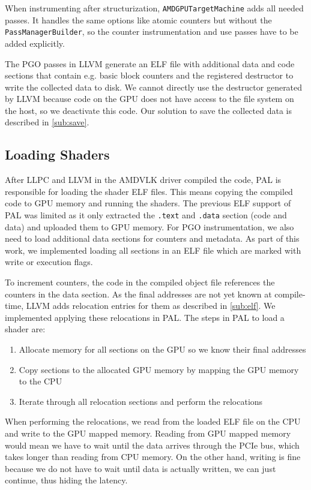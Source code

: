 When instrumenting after structurization, \texttt{AMDGPUTargetMachine} adds all needed passes.
It handles the same options like atomic counters but without the \texttt{PassManagerBuilder}, so the counter instrumentation and use passes have to be added explicitly.

The PGO passes in LLVM generate an ELF file with additional data and code sections that contain e.g. basic block counters and the registered destructor to write the collected data to disk.
We cannot directly use the destructor generated by LLVM because code on the GPU does not have access to the file system on the host, so we deactivate this code.
Our solution to save the collected data is described in \cref{sub:save}.

\subsection{Loading Shaders}
\label{sub:loading}
After LLPC and LLVM in the AMDVLK driver compiled the code, PAL is responsible for loading the shader ELF files.
This means copying the compiled code to GPU memory and running the shaders.
The previous ELF support of PAL was limited as it only extracted the \texttt{.text} and \texttt{.data} section (code and data) and uploaded them to GPU memory.
For PGO instrumentation, we also need to load additional data sections for counters and metadata.
As part of this work, we implemented loading all sections in an ELF file which are marked with write or execution flags.

To increment counters, the code in the compiled object file references the counters in the data section.
As the final addresses are not yet known at compile-time, LLVM adds relocation entries for them as described in \cref{sub:elf}.
We implemented applying these relocations in PAL. The steps in PAL to load a shader are:
\begin{enumerate}
	\item Allocate memory for all sections on the GPU so we know their final addresses
	\item Copy sections to the allocated GPU memory by mapping the GPU memory to the CPU
	\item Iterate through all relocation sections and perform the relocations
\end{enumerate}
When performing the relocations, we read from the loaded ELF file on the CPU and write to the GPU mapped memory.
Reading from GPU mapped memory would mean we have to wait until the data arrives through the PCIe bus, which takes longer than reading from CPU memory.
On the other hand, writing is fine because we do not have to wait until data is actually written, we can just continue, thus hiding the latency.


